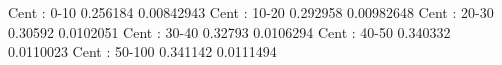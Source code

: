 Cent : 0-10
0.256184 0.00842943
Cent : 10-20
0.292958 0.00982648
Cent : 20-30
0.30592 0.0102051
Cent : 30-40
0.32793 0.0106294
Cent : 40-50
0.340332 0.0110023
Cent : 50-100
0.341142 0.0111494
